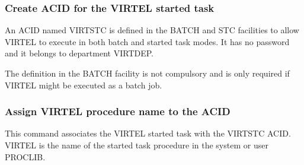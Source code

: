 \documentclass[letterpaper,10pt,english]{sphinxmanual}
\begin{document}
\subsubsection{Create ACID for the VIRTEL started task}
\label{\detokenize{Installation_Guide:create-acid-for-the-virtel-started-task}}
\begin{sphinxVerbatim}[commandchars=\\\{\}]
    
           
          
\end{sphinxVerbatim}


An ACID named VIRTSTC is defined in the BATCH and STC facilities to allow VIRTEL to execute in both batch and started task modes. It has no password and it belongs to department VIRTDEP.

The definition in the BATCH facility is not compulsory and is only required if VIRTEL might be executed as a batch job.


\subsubsection{Assign VIRTEL procedure name to the ACID}
\label{\detokenize{Installation_Guide:assign-virtel-procedure-name-to-the-acid}}
\begin{sphinxVerbatim}[commandchars=\\\{\}]
   
\end{sphinxVerbatim}


This command associates the VIRTEL started task with the VIRTSTC ACID. VIRTEL is the name of the started task procedure in the system or user PROCLIB.
\end{document}
